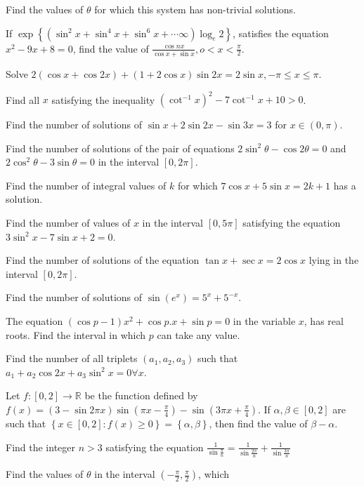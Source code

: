   Find the values of $\theta$ for which this system has non-trivial solutions.
\item If $\exp\left\{\left(\sin^2x + \sin^4x + \sin^6x + \cdots \infty\right)\log_e2\right\}$, satisfies the
  equation $x^2 - 9x + 8 = 0$, find the value of $\frac{\cos nx}{\cos x + \sin x}, o < x < \frac{\pi}{2}$.
\item Solve $2(\cos x + \cos2x) + (1 + 2\cos x)\sin2x = 2\sin x, -\pi\le x\le \pi$.
\item Find all $x$ satisfying the inequality $\left(\cot^{-1}x\right)^2 - 7\cot^{-1}x + 10 > 0$.
\item Find the number of solutions of $\sin x + 2\sin2x - \sin3x = 3$ for $x\in(0, \pi)$.
\item Find the number of solutions of the pair of equations $2\sin^2\theta - \cos2\theta = 0$ and
  $2\cos^2\theta - 3\sin\theta = 0$ in the interval $[0, 2\pi]$.
\item Find the number of integral values of $k$ for which $7\cos x + 5\sin x = 2k + 1$ has a solution.
\item Find the number of values of $x$ in the interval $[0, 5\pi]$ satisfying the equation $3\sin^2x - 7\sin
  x + 2 = 0$.
\item Find the number of solutions of the equation $\tan x + \sec x = 2\cos x$ lying in the interval $[0,
  2\pi]$.
\item Find the number of solutions of $\sin\left(e^x\right) = 5^x + 5^{-x}$.
\item The equation $(\cos p - 1)x^2 + \cos p.x + \sin p = 0$ in the variable $x$, has real roots. Find the
  interval in which $p$ can take any value.
\item Find the number of all triplets $(a_1, a_2, a_3)$ such that $a_1 + a_2\cos2x + a_3\sin^2x = 0\forall
  x$.
\item Let $f: [0, 2] \rightarrow\mathbb{R}$ be the function defined by $f(x) = (3 - \sin 2\pi
  x)\sin\left(\pi x - \frac{\pi}{4}\right) - \sin\left(3\pi x + \frac{\pi}{4}\right)$. If
  $\alpha, \beta\in[0, 2]$ are such that $\left\{x\in[0, 2]: f(x)\ge 0\right\}
  = \left\{\alpha, \beta\right\}$, then find the value of $\beta - \alpha$.
\item Find the integer $n > 3$ satisfying the equation $\frac{1}{\sin\frac{\pi}{n}}
  = \frac{1}{\sin\frac{2\pi}{n}} + \frac{1}{\sin\frac{3\pi}{n}}$
\item Find the values of $\theta$ in the interval $\left(-\frac{\pi}{2}, \frac{\pi}{2}\right)$, which
